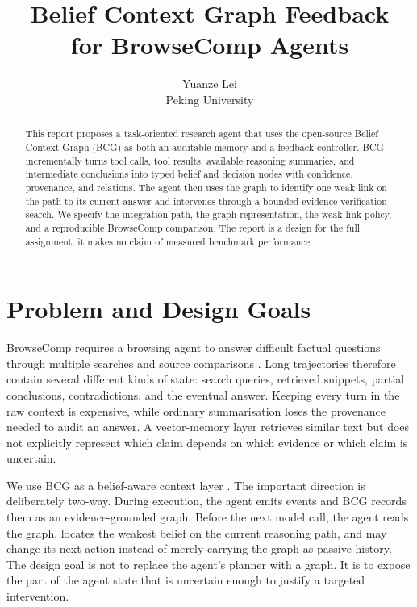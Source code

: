\documentclass{article}
\title{Belief Context Graph Feedback\\
for BrowseComp Agents}
\author{%
  Yuanze Lei \quad 2510124204\\
  Peking University
}
\begin{document}
\maketitle

\begin{abstract}
This report proposes a task-oriented research agent that uses the open-source
Belief Context Graph (BCG) as both an auditable memory and a feedback
controller. BCG incrementally turns tool calls, tool results, available
reasoning summaries, and intermediate conclusions into typed belief and
decision nodes with confidence, provenance, and relations. The agent then uses
the graph to identify one weak link on the path to its current answer and
intervenes through a bounded evidence-verification search. We specify the
integration path, the graph representation, the weak-link policy, and a
reproducible BrowseComp comparison. The report is a design for the full
assignment; it makes no claim of measured benchmark performance.
\end{abstract}

\section{Problem and Design Goals}\label{sec:problem}

BrowseComp requires a browsing agent to answer difficult factual questions
through multiple searches and source comparisons \citep{wei2025browsecomp}.
Long trajectories therefore contain several different kinds of state: search
queries, retrieved snippets, partial conclusions, contradictions, and the
eventual answer. Keeping every turn in the raw context is expensive, while
ordinary summarisation loses the provenance needed to audit an answer. A
vector-memory layer retrieves similar text but does not explicitly represent
which claim depends on which evidence or which claim is uncertain.

We use BCG as a belief-aware context layer \citep{bcg2026}. The important
direction is deliberately two-way. During execution, the agent emits events and
BCG records them as an evidence-grounded graph. Before the next model call, the
agent reads the graph, locates the weakest belief on the current reasoning
path, and may change its next action instead of merely carrying the graph as
passive history. The design goal is not to replace the agent's planner with a
graph. It is to expose the part of the agent state that is uncertain enough to
justify a targeted intervention.
\end{document}
